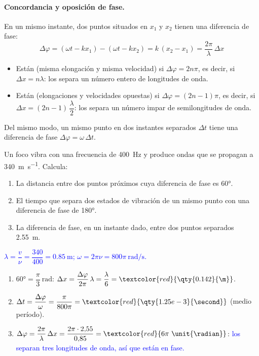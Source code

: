 \paragraph{Concordancia y oposición de fase.} En un mismo instante, dos puntos situados en \(x_1\) y \(x_2\) tienen una
diferencia de fase:
\begin{equation*}
    \Delta\varphi = (\omega t - k x_1) - (\omega t - k x_2) = k\,(x_2 - x_1) = \dfrac{2\pi}{\lambda}\,\Delta x
\end{equation*}
\begin{itemize}
    \item Están  (misma elongación y misma velocidad) si \(\Delta\varphi = 2n\pi\), es decir, si
    \(\boxed{\Delta x = n\lambda}\): los separa un número entero de longitudes de onda.
    \item Están  (elongaciones y velocidades opuestas) si \(\Delta\varphi = (2n - 1)\pi\), es
    decir, si \(\boxed{\Delta x = (2n - 1)\,\dfrac{\lambda}{2}}\): los separa un número impar de semilongitudes de onda.
\end{itemize}
Del mismo modo, un mismo punto en dos instantes separados \(\Delta t\) tiene una diferencia de fase \(\Delta\varphi =
\omega\,\Delta t\).

\begin{exercise}
    Un foco vibra con una frecuencia de \qty{400}{\hertz} y produce ondas que se propagan a \qty{340}{\m\per\second}. Calcula:
    \begin{enumerate}[label=\letraminuscula]
        \item La distancia entre dos puntos próximos cuya diferencia de fase es \ang{60}.
        \item El tiempo que separa dos estados de vibración de un mismo punto con una diferencia de fase de \ang{180}.
        \item La diferencia de fase, en un instante dado, entre dos puntos separados \qty{2.55}{\m}.
    \end{enumerate}
    \begin{solu}
        \textcolor{blue}{\(\lambda = \dfrac{v}{\nu} = \dfrac{340}{400} = \qty{0.85}{\m}\); \(\omega = 2\pi\nu = 800\pi\ \unit{\radian\per\second}\).}
        \begin{enumerate}[label=\letraminuscula]
            \item \(\ang{60} = \dfrac{\pi}{3}\ \unit{\radian}\):
            \(\Delta x = \dfrac{\Delta\varphi}{2\pi}\,\lambda = \dfrac{\lambda}{6} = \textcolor{red}{\qty{0.142}{\m}}\).
            \item \(\Delta t = \dfrac{\Delta\varphi}{\omega} = \dfrac{\pi}{800\pi} = \textcolor{red}{\qty{1.25e-3}{\second}}\) (medio período).
            \item \(\Delta\varphi = \dfrac{2\pi}{\lambda}\,\Delta x = \dfrac{2\pi\cdot 2{,}55}{0{,}85} = \textcolor{red}{6\pi\ \unit{\radian}}\):
            \textcolor{blue}{los separan tres longitudes de onda, así que están en fase.}
        \end{enumerate}
    \end{solu}
\end{exercise}

